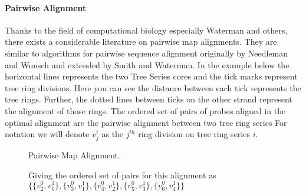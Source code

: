 \documentclass[11pt]{article}
\begin{document}
\paragraph{Pairwise Alignment\newline}{
\par{
Thanks to the field of computational biology especially Waterman and others, there exists a considerable literature on pairwise map alignments.\cite{Waterman84}\cite{Waterman1}\cite{ValouevAlignment}\cite{SOMA}  They are similar to algorithms for pairwise sequence alignment originally by Needleman and Wunsch\cite{NeedlemanWunsch} and extended by Smith and Waterman.\cite{SmithWaterman}\cite{Durbin} In the example below the horizontal lines represents the two Tree Series cores and the tick marks represent tree ring divisions.  Here you can see the distance between each tick represents the tree rings.  Further, the dotted lines between ticks on the other strand represent the alignment of those rings.  The ordered set of pairs of probes aligned in the optimal alignment are the pairwise alignment between two tree ring series  For notation we will denote $v^{i}_j$ as the $j^{th}$ ring division on tree ring series $i$.

}
\begin{figure}[h!]
 \caption{Pairwise Map Alignment.}
\begin{center}
\caption{Giving the ordered set of pairs for this alignment as $\{\{v^0_2,v^1_0\},\{v^0_3,v^1_1\},\{v^0_4,v^1_2\},\{v^0_5,v^1_3\},\{v^0_6,v^1_4\}\}$
}
\end{center}
\end{figure}

}
\end{document}
